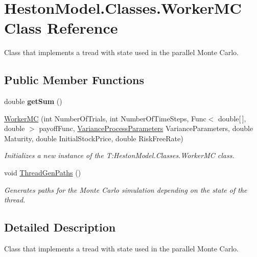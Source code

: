 \hypertarget{class_heston_model_1_1_classes_1_1_worker_m_c}{}\section{Heston\+Model.\+Classes.\+Worker\+MC Class Reference}
\label{class_heston_model_1_1_classes_1_1_worker_m_c}


Class that implements a tread with state used in the parallel Monte Carlo.  


\subsection*{Public Member Functions}
\begin{DoxyCompactItemize}
\item 
\mbox{\label{class_heston_model_1_1_classes_1_1_worker_m_c_a7023d8d3a3651613e3d8e50d5e30ccbc}} 
double {\bfseries get\+Sum} ()
\item 
\mbox{\hyperlink{class_heston_model_1_1_classes_1_1_worker_m_c_a6ec8fc06286f888afa631bb4fdf83faf}{Worker\+MC}} (int Number\+Of\+Trials, int Number\+Of\+Time\+Steps, Func$<$ double\mbox{[}$\,$\mbox{]}, double $>$ payoff\+Func, \mbox{\hyperlink{class_heston_model_1_1_classes_1_1_interface_classes_1_1_variance_process_parameters}{Variance\+Process\+Parameters}} Variance\+Parameters, double Maturity, double Initial\+Stock\+Price, double Risk\+Free\+Rate)
\begin{DoxyCompactList}\small\item\em Initializes a new instance of the T\+:\+Heston\+Model.\+Classes.\+Worker\+MC class. \end{DoxyCompactList}\item 
void \mbox{\hyperlink{class_heston_model_1_1_classes_1_1_worker_m_c_a652df25340bf5f45727b3690e7c49c06}{Thread\+Gen\+Paths}} ()
\begin{DoxyCompactList}\small\item\em Generates paths for the Monte Carlo simulation depending on the state of the thread. \end{DoxyCompactList}\end{DoxyCompactItemize}


\subsection{Detailed Description}
Class that implements a tread with state used in the parallel Monte Carlo. 



